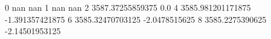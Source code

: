 0 nan nan
1 nan nan
2 3587.37255859375 0.0
4 3585.981201171875 -1.391357421875
6 3585.32470703125 -2.0478515625
8 3585.2275390625 -2.14501953125
